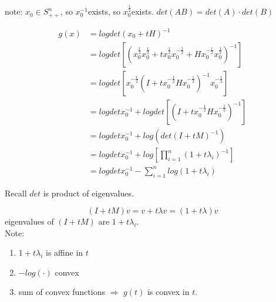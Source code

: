 note: $x_0\in S^n_{++}$, so $x_0^{-1}$exists, so $x_0^{\frac{1}{2}}$exists. $det(AB) = det(A)\cdot det(B)$

\begin{align*}
g(x) &= logdet(x_0+tH)^{-1}\\
&= logdet[(x_0^{\frac{1}{2}}x_0^{\frac{1}{2}}+tx_0^{\frac{1}{2}}x_0^{-\frac{1}{2}}+Hx_0^{-\frac{1}{2}}x_0^{\frac{1}{2}})^{-1}]\\
&= logdet[x_0^{-\frac{1}{2}}(I+tx_0^{-\frac{1}{2}}Hx_0^{-\frac{1}{2}})^{-1}x_0^{-\frac{1}{2}}]\\
&= logdetx_0^{-1} + logdet[(I+tx_0^{-\frac{1}{2}}Hx_0^{-\frac{1}{2}})^{-1}]\\
&= logdetx_0^{-1}+log(det(I+tM)^{-1})\\
&= logdetx_0^{-1}+log[\prod^n_{i=1}(1+t\lambda_i)^{-1}]\\
&= logdetx_0^{-1} - \sum_{i=1}^nlog(1+t\lambda_i)
\end{align*}

Recall $det$ is product of eigenvalues. 

\begin{equation*}
(I+tM)v = v+t\lambda v = (1+t\lambda)v
\end{equation*}
eigenvalues of $(I+tM)$ are $1+t\lambda_i$.\\

Note:

\begin{enumerate}
	\item $1+t\lambda_i$ is affine in $t$
	
	\item $-log(\cdot)$ convex
	
	\item sum of convex functions $\Rightarrow$ $g(t)$ is convex in $t$.
\end{enumerate}







